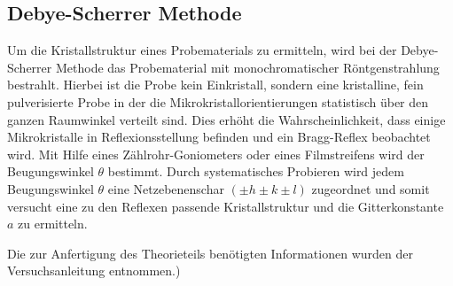 \subsection{Debye-Scherrer Methode}
\label{subsec:Methoden}
Um die Kristallstruktur eines Probematerials
zu ermitteln, wird bei der Debye-Scherrer Methode
das Probematerial mit monochromatischer
Röntgenstrahlung bestrahlt.
Hierbei ist die Probe kein
Einkristall, sondern eine
kristalline, fein pulverisierte Probe
in der die Mikrokristallorientierungen statistisch
über den ganzen Raumwinkel verteilt sind.
Dies erhöht die Wahrscheinlichkeit, dass
einige Mikrokristalle in Reflexionsstellung
befinden und ein Bragg-Reflex beobachtet wird.
Mit Hilfe eines
Zählrohr-Goniometers oder
eines Filmstreifens wird der Beugungswinkel $\theta$
bestimmt. Durch systematisches Probieren wird
jedem Beugungswinkel $\theta$ eine Netzebenenschar
${(\pm h \pm k \pm l)}$ zugeordnet und somit versucht
eine zu den Reflexen passende Kristallstruktur und
die Gitterkonstante $a$
zu ermitteln.


Die zur Anfertigung des Theorieteils benötigten Informationen wurden der Versuchsanleitung entnommen.\cite{sample})
